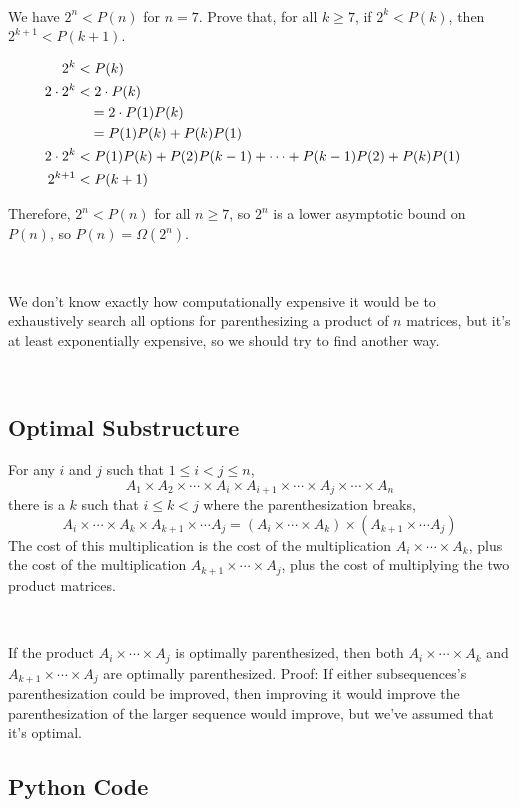 \

We have $2^n < P(n)$ for $n=7$.  Prove that, for all $k\ge 7$, if $2^k < P(k)$, then $2^{k+1} < P(k+1)$.  

\begin{align*}
	2^k &< P(k) \cr
	2 \cdot 2^k &< 2 \cdot P(k) \cr
	& \quad =  2 \cdot P(1)P(k) \cr
	& \quad = P(1)P(k) + P(k)P(1) \cr
	2 \cdot 2^k &< P(1) P(k) + P(2) P(k-1) + \cdots + P(k-1)P(2) + P(k)P(1)  \cr
	2^{k+1} &< P(k+1) \cr
\end{align*}

Therefore, $2^n < P(n)$ for all $n \ge 7$, so $2^n$ is a lower asymptotic bound on $P(n)$, so $P(n) = \Omega(2^n)$.

\

We don't know exactly how computationally expensive it would be to exhaustively search all options for parenthesizing a product of $n$ matrices, but it's at least exponentially expensive, so we should try to find another way.  

\

\subsection{Optimal Substructure}

For any $i$ and $j$ such that $1 \le i < j \le n$, 
$$A_1 \times A_2 \times \cdots \times A_i \times A_{i+1} \times \cdots \times A_j \times \cdots \times A_n$$
there is a $k$ such that $i \le k < j$ where the parenthesization breaks, 
$$A_i \times \cdots \times A_k \times A_{k+1} \times \cdots A_j = 
(A_i \times \cdots \times A_k) \times (A_{k+1} \times \cdots A_j)
$$
The cost of this multiplication is the cost of the multiplication $A_i \times \cdots \times A_k$, plus the cost of the multiplication $A_{k+1} \times \cdots \times A_j$, plus the cost of multiplying the two product matrices.  

\

If the product $A_i \times \cdots \times A_j$ is optimally parenthesized, then both $A_i \times \cdots \times A_k$ and $A_{k+1} \times \cdots \times A_j$ are optimally parenthesized.  Proof:   If either subsequences's parenthesization could be improved, then improving it would improve the parenthesization of the larger sequence would improve, but we've assumed that it's optimal.  

\subsection{Python Code}


